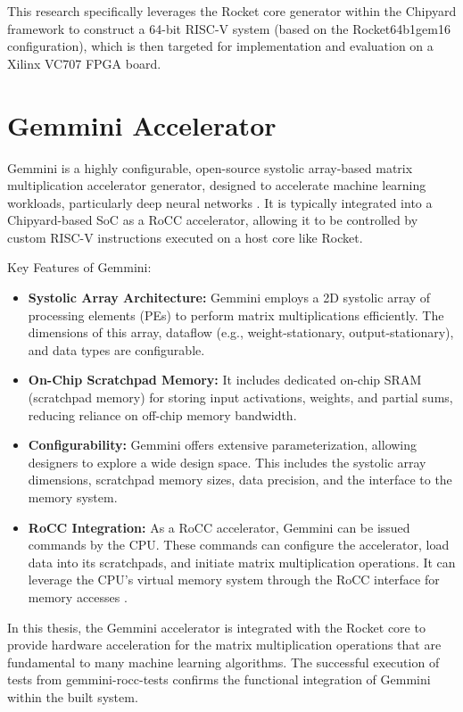 This research specifically leverages the Rocket core generator within the Chipyard framework to construct a 64-bit RISC-V system (based on the Rocket64b1gem16 configuration), which is then targeted for implementation and evaluation on a Xilinx VC707 FPGA board.

\section{Gemmini Accelerator}
\label{sec:gemmini_accelerator}

Gemmini is a highly configurable, open-source systolic array-based matrix multiplication accelerator generator, designed to accelerate machine learning workloads, particularly deep neural networks \cite{genc2019gemmini, chipyard}. It is typically integrated into a Chipyard-based SoC as a RoCC accelerator, allowing it to be controlled by custom RISC-V instructions executed on a host core like Rocket.

Key Features of Gemmini:
\begin{itemize}
    \item \textbf{Systolic Array Architecture:} Gemmini employs a 2D systolic array of processing elements (PEs) to perform matrix multiplications efficiently. The dimensions of this array, dataflow (e.g., weight-stationary, output-stationary), and data types are configurable.

    \item \textbf{On-Chip Scratchpad Memory:} It includes dedicated on-chip SRAM (scratchpad memory) for storing input activations, weights, and partial sums, reducing reliance on off-chip memory bandwidth.

    \item \textbf{Configurability:} Gemmini offers extensive parameterization, allowing designers to explore a wide design space. This includes the systolic array dimensions, scratchpad memory sizes, data precision, and the interface to the memory system.

    \item \textbf{RoCC Integration:} As a RoCC accelerator, Gemmini can be issued commands by the CPU. These commands can configure the accelerator, load data into its scratchpads, and initiate matrix multiplication operations. It can leverage the CPU's virtual memory system through the RoCC interface for memory accesses \cite[p.~13]{chipyard}.
\end{itemize}

In this thesis, the Gemmini accelerator is integrated with the Rocket core to provide hardware acceleration for the matrix multiplication operations that are fundamental to many machine learning algorithms. The successful execution of tests from gemmini-rocc-tests confirms the functional integration of Gemmini within the built system.

